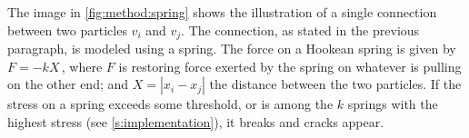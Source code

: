 
The image in \cref{fig:method:spring} shows the illustration of a single connection between two particles $v_i$ and $v_j$. The connection, as stated in the previous paragraph, is modeled using a spring. The force on a Hookean spring is given by $F = -k X\,$, where $F$ is restoring force exerted by the spring on whatever is pulling on the other end; and $X = |x_i - x_j|$ the distance between the two particles. If the stress on a spring exceeds some threshold, or is among the $k$ springs with the highest stress (see \cref{s:implementation}), it breaks and cracks appear.



